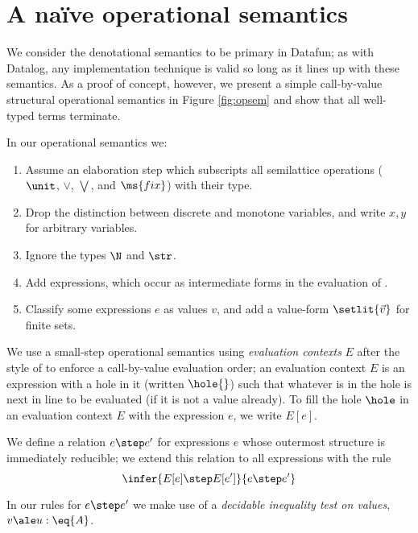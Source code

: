 
\section{A na\"ive operational semantics}

We consider the denotational semantics to be primary in Datafun; as with
Datalog, any implementation technique is valid so long as it lines up with these
semantics. As a proof of concept, however, we present a simple call-by-value
structural operational semantics in Figure \ref{fig:opsem} and show that all
well-typed terms terminate.

In our operational semantics we:
\begin{enumerate}
\item Assume an elaboration step which subscripts all semilattice operations
  ($\unit$, $\vee$, $\bigvee$, and $\ms{fix}$) with their type.
\item Drop the distinction between discrete and monotone variables, and write
  $x,y$ for arbitrary variables.
\item Ignore the types $\N$ and $\str$. 
\item Add  expressions, which occur as intermediate forms in the
  evaluation of .
\item Classify some expressions $e$ as values $v$, and add a value-form
  $\setlit{\vec{v}}$ for finite sets.
\end{enumerate}

We use a small-step operational semantics using \emph{evaluation contexts} $E$
after the style of \citet{reduction-contexts} to enforce a call-by-value
evaluation order; an evaluation context $E$ is an expression with a hole in it
(written $\hole{}$) such that whatever is in the hole is next in line to be
evaluated (if it is not a value already). To fill the hole $\hole$ in an
evaluation context $E$ with the expression $e$, we write $E[e]$.

We define a relation $e \step e'$ for expressions $e$ whose outermost structure
is immediately reducible; we extend this relation to all expressions with the
rule
\[\infer{E[e] \step E[e']}{e \step e'}\]

In our rules for $e \step e'$ we make use of a \emph{decidable inequality test
  on values}, $v \ale u : \eq{A}$.
